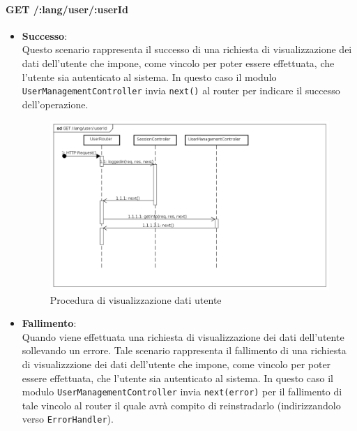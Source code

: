 \paragraph{GET /:lang/user/:userId}
\begin{itemize}
\item \textbf{Successo}:\\
Questo scenario rappresenta il successo di una richiesta di visualizzazione dei dati dell'utente che impone, come vincolo per poter essere effettuata, che l'utente sia autenticato al sistema.  
In questo caso il modulo \texttt{UserManagementController} invia \texttt{next()} al router per indicare il successo dell'operazione.

\label{Procedura di visualizzazione dati utente}
\begin{figure}[ht]
	\centering
	\includegraphics[scale=0.40]{UML/DiagrammiDiSequenza/Back-end/GET_LangUserUserIdSuccess.png}
	\caption{Procedura di visualizzazione dati utente}
\end{figure}

\FloatBarrier

\item \textbf{Fallimento}:
\\
Quando viene effettuata una richiesta di visualizzazione dei dati dell'utente sollevando un errore. Tale scenario rappresenta il fallimento di una richiesta di visualizzzione dei dati dell'utente che impone, come vincolo per poter essere effettuata, che l'utente sia autenticato al sistema. In questo caso il modulo \texttt{UserManagementController} invia \texttt{next(error)} per il fallimento di tale vincolo al router il quale avrà compito di reinstradarlo (indirizzandolo verso \texttt{ErrorHandler}).


\end{itemize}
